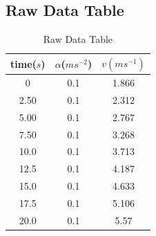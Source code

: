 \documentclass[12pt,a4paper]{article}
\begin{document}
\begin{spacing}{1.25}
\begin{figure}[H]
        \end{figure}
        \begin{figure}[H]
            \centering  %
            \end{figure}
\subsection{Raw Data Table}
\begin{table}[!ht]
    \centering
    \begin{tabular}{|c|c|c|}
    \hline
        time($ s $) & $ \alpha $($ ms^{-2} $) & $ v $$(ms^{-1})$ \\ \hline
        0 & 0.1 & 1.866  \\ \hline
        2.50 & 0.1 & 2.312  \\ \hline
        5.00 & 0.1 & 2.767  \\ \hline
        7.50 & 0.1 & 3.268  \\ \hline
        10.0 & 0.1 & 3.713  \\ \hline
        12.5 & 0.1 & 4.187  \\ \hline
        15.0 & 0.1 & 4.633  \\ \hline
        17.5 & 0.1 & 5.106  \\ \hline
        20.0 & 0.1 & 5.57 \\ \hline
    \end{tabular}
    \caption{Raw Data Table}
\end{table}


\end{spacing}
\end{document}

